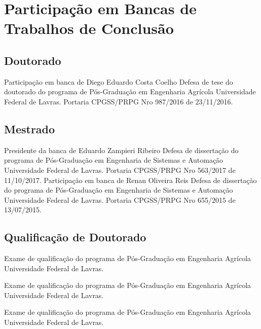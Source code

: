 \documentclass[11pt,a4paper,sans]{moderncv} %
\begin{document}
\section{Participação em Bancas de Trabalhos de Conclusão}
\subsection{Doutorado}
			{Participação em banca de Diego Eduardo Costa Coelho}
			{Defesa de tese do doutorado do programa de Pós-Graduação em Engenharia Agrícola}{}
			{Universidade Federal de Lavras. Portaria CPGSS/PRPG Nro 987/2016 de 23/11/2016.}

\subsection{Mestrado}
			{Presidente da banca de Eduardo Zampieri Ribeiro}
			{Defesa de dissertação do programa de Pós-Graduação em Engenharia de Sistemas e Automação}{}
			{Universidade Federal de Lavras. Portaria CPGSS/PRPG Nro 563/2017 de 11/10/2017.}
			{Participação em banca de Renan Oliveira Reis}
			{Defesa de dissertação do programa de Pós-Graduação em Engenharia de Sistemas e Automação}{}
			{Universidade Federal de Lavras. Portaria CPGSS/PRPG Nro 655/2015 de 13/07/2015.}

\subsection{Qualificação de Doutorado}
			{}
			{Exame de qualificação do programa de Pós-Graduação em Engenharia Agrícola}{}
			{Universidade Federal de Lavras.}

			{}
			{Exame de qualificação do programa de Pós-Graduação em Engenharia Agrícola}{}
			{Universidade Federal de Lavras.}

			{}
			{Exame de qualificação do programa de Pós-Graduação em Engenharia Agrícola}{}
			{Universidade Federal de Lavras.}
			
\end{document}
